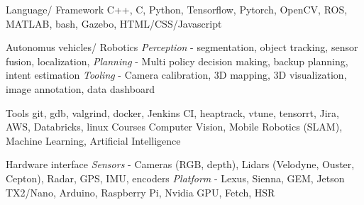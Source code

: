 \vspace{-2mm}

\begin{cvskills}

  \cvskill
    {Language/ Framework} %
    {C++, C, Python, Tensorflow, Pytorch, OpenCV, ROS, MATLAB, bash, Gazebo, HTML/CSS/Javascript} %

  \cvskill
	{Autonomus vehicles/ Robotics} %
	{\textit{Perception} - segmentation, object tracking, sensor fusion, localization,\linebreak
	\textit{Planning} - Multi policy decision making, backup planning, intent estimation\linebreak
	\textit{Tooling} - Camera calibration, 3D mapping, 3D visualization, image annotation, data dashboard} %

	\cvskill
	{Tools} %
	{git, gdb, valgrind, docker, Jenkins CI, heaptrack, vtune, tensorrt, Jira, AWS, Databricks, linux } %
	\cvskill
	{Courses} %
	{Computer Vision, Mobile Robotics (SLAM), Machine Learning, Artificial Intelligence} %

	\cvskill
	{Hardware interface} %
	{\textit{Sensors} - Cameras (RGB, depth), Lidars (Velodyne, Ouster, Cepton), Radar, GPS, IMU, encoders\linebreak
	\textit{Platform} - Lexus, Sienna, GEM, Jetson TX2/Nano, Arduino, Raspberry Pi, Nvidia GPU,  Fetch, HSR} %

\end{cvskills}
